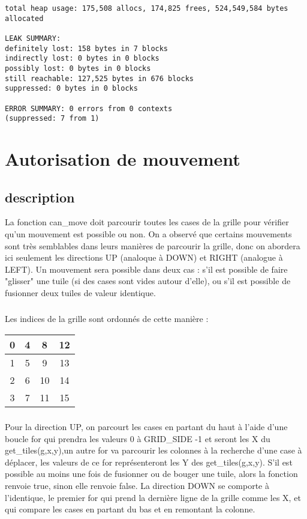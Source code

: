 \documentclass{report}
\begin{document}
\begin{lstlisting}
total heap usage: 175,508 allocs, 174,825 frees, 524,549,584 bytes allocated

LEAK SUMMARY:
definitely lost: 158 bytes in 7 blocks
indirectly lost: 0 bytes in 0 blocks
possibly lost: 0 bytes in 0 blocks
still reachable: 127,525 bytes in 676 blocks
suppressed: 0 bytes in 0 blocks

ERROR SUMMARY: 0 errors from 0 contexts
(suppressed: 7 from 1)

\end{lstlisting}




\chapter{Autorisation de mouvement}
\section{description}

La fonction can{\_}move doit parcourir toutes les cases de la grille pour vérifier qu'un mouvement est possible ou non. On a observé que certains mouvements sont très semblables dans leurs manières de parcourir la grille, donc on abordera ici seulement les directions UP (analoque à DOWN) et RIGHT (analogue à LEFT). Un mouvement sera possible dans deux cas : s'il est possible de faire "glisser" une tuile (si des cases sont vides autour d'elle), ou s'il est possible de fusionner deux tuiles de valeur identique.

\paragraph{}Les indices de la grille sont ordonnés de cette manière : 
\begin{tabular}{|c|c|c|c|}
  \hline
  0 & 4 & 8 & 12 \\
  \hline
  1 & 5 & 9 & 13 \\
  \hline
  2 & 6 & 10 & 14 \\
  \hline
  3 & 7 & 11 & 15 \\
  \hline

\end{tabular}


\paragraph{}Pour la direction UP, on parcourt les cases en partant du
haut à l'aide d'une boucle for qui prendra les valeurs 0 à GRID{\_}SIDE -1 et
seront les X du get{\_}tiles(g,x,y),un autre for va parcourir les colonnes
à la recherche d'une case à déplacer, les valeurs de ce for
représenteront les Y des get{\_}tiles(g,x,y).
S'il est possible au moins une fois de fusionner ou de bouger une
tuile, alors la fonction renvoie true, sinon elle renvoie false. La
direction DOWN se comporte à l'identique, le premier for qui prend la
dernière ligne de la grille comme les X, et qui compare les cases en
partant du bas et en remontant la colonne.
\end{document}
